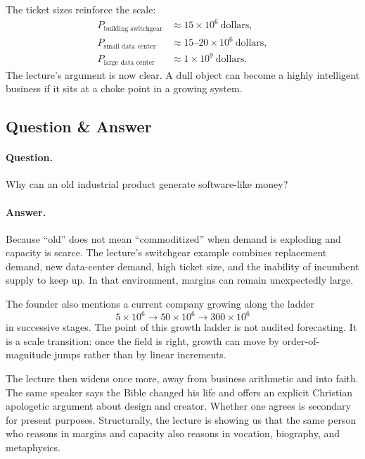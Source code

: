 The ticket sizes reinforce the scale:
\begin{align}
P_{\text{building switchgear}} &\approx 15 \times 10^6 \ \text{dollars},\\
P_{\text{small data center}} &\approx 15\text{--}20 \times 10^6 \ \text{dollars},\\
P_{\text{large data center}} &\approx 1 \times 10^9 \ \text{dollars}.
\end{align}
The lecture's argument is now clear. A dull object can become a highly intelligent business if it sits at a choke point in a growing system.

\subsection{Question \& Answer}

\paragraph{Question.} Why can an old industrial product generate software-like money?

\paragraph{Answer.} Because ``old'' does not mean ``commoditized'' when demand is exploding and capacity is scarce. The lecture's switchgear example combines replacement demand, new data-center demand, high ticket size, and the inability of incumbent supply to keep up. In that environment, margins can remain unexpectedly large.

The founder also mentions a current company growing along the ladder
\begin{equation}
5 \times 10^6 \to 50 \times 10^6 \to 300 \times 10^6
\end{equation}
in successive stages. The point of this growth ladder is not audited forecasting. It is a scale transition: once the field is right, growth can move by order-of-magnitude jumps rather than by linear increments.

The lecture then widens once more, away from business arithmetic and into faith. The same speaker says the Bible changed his life and offers an explicit Christian apologetic argument about design and creator. Whether one agrees is secondary for present purposes. Structurally, the lecture is showing us that the same person who reasons in margins and capacity also reasons in vocation, biography, and metaphysics.

